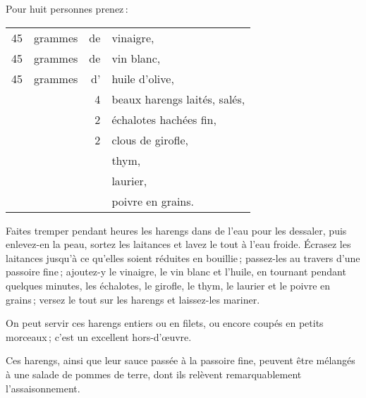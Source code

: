 Pour huit personnes prenez :

\medskip

\footnotesize
\begin{longtable}{rrrp{16em}}
     45 & grammes & de & vinaigre,                                                                        \\
     45 & grammes & de & vin blanc,                                                                       \\
     45 & grammes & d' & huile d'olive,                                                                   \\
        &         &  4 & beaux harengs laités, salés,                                                     \\
        &         &  2 & échalotes hachées fin,                                                           \\
        &         &  2 & clous de girofle,                                                                \\
        &         &    & thym,                                                                            \\
        &         &    & laurier,                                                                         \\
        &         &    & poivre en grains.                                                                \\
\end{longtable}
\normalsize

Faites tremper pendant {\mmm} heures les harengs dans de l'eau pour les dessaler,
puis enlevez-en la peau, sortez les laitances et lavez le tout à l'eau froide.
Écrasez les laitances jusqu'à ce qu'elles soient réduites en bouillie ;
passez-les au travers d'une passoire fine ; ajoutez-y le vinaigre, le vin blanc
et l'huile, en tournant pendant quelques minutes, les échalotes, le girofle, le
thym, le laurier et le poivre en grains ; versez le tout sur les harengs et
laissez-les mariner.

On peut servir ces harengs entiers ou en filets, ou encore coupés en petits
morceaux ; c'est un excellent hors-d'œuvre.

\sk

Ces harengs, ainsi que leur sauce passée à la passoire fine, peuvent être
mélangés à une salade de pommes de terre, dont ils relèvent remarquablement
l'assaisonnement.

